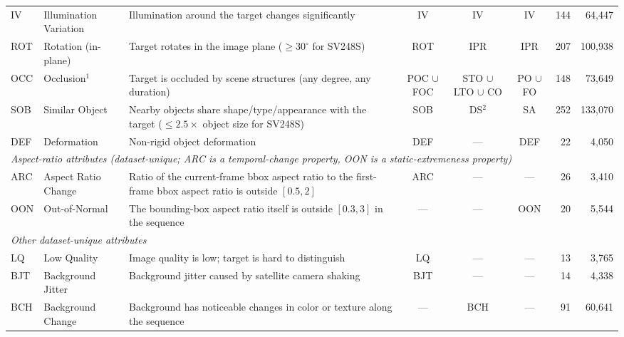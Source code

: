 \begin{table}[t]
{\begin{tabular}{llp{6.6cm}cccrr}
IV   & Illumination Variation   & Illumination around the target changes significantly                                                  & IV  & IV                         & IV             & 144 & 64{,}447  \\
ROT  & Rotation (in-plane)      & Target rotates in the image plane ($\geq 30^{\circ}$ for SV248S)                                      & ROT & IPR                        & IPR            & 207 & 100{,}938 \\
OCC  & Occlusion$^{1}$          & Target is occluded by scene structures (any degree, any duration)                                     & POC $\cup$ FOC & STO $\cup$ LTO $\cup$ CO & PO $\cup$ FO  & 148 & 73{,}649  \\
SOB  & Similar Object           & Nearby objects share shape/type/appearance with the target ($\leq 2.5\times$ object size for SV248S)  & SOB & DS$^{2}$                   & SA             & 252 & 133{,}070 \\
DEF  & Deformation              & Non-rigid object deformation                                                                          & DEF & ---                        & DEF            &  22 &  4{,}050  \\
\midrule
\multicolumn{8}{l}{\emph{Aspect-ratio attributes (dataset-unique; ARC is a temporal-change property, OON is a static-extremeness property)}} \\
ARC  & Aspect Ratio Change      & Ratio of the current-frame bbox aspect ratio to the first-frame bbox aspect ratio is outside $[0.5, 2]$ & ARC & ---          & ---            &  26 &  3{,}410  \\
OON  & Out-of-Normal            & The bounding-box aspect ratio itself is outside $[0.3, 3]$ in the sequence                            & --- & ---                        & OON            &  20 &  5{,}544  \\
\midrule
\multicolumn{8}{l}{\emph{Other dataset-unique attributes}} \\
LQ   & Low Quality              & Image quality is low; target is hard to distinguish                                                   & LQ  & ---                        & ---            &  13 &  3{,}765  \\
BJT  & Background Jitter        & Background jitter caused by satellite camera shaking                                                  & BJT & ---                        & ---            &  14 &  4{,}338  \\
BCH  & Background Change        & Background has noticeable changes in color or texture along the sequence                              & --- & BCH                        & ---            &  91 & 60{,}641  \\

\end{tabular}}
\end{table}
